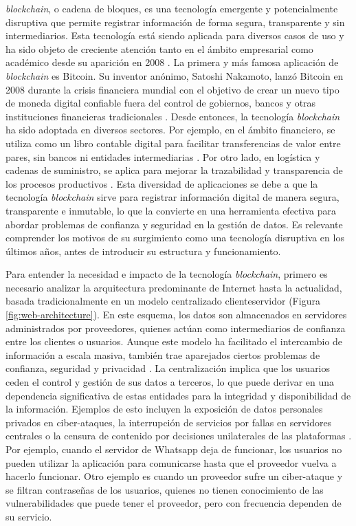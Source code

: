 \textit{\Gls{blockchain}}, o cadena de bloques, es una tecnología emergente y potencialmente disruptiva que permite registrar información de forma segura, transparente y sin intermediarios. Esta tecnología está siendo aplicada para diversos casos de uso y ha sido objeto de creciente atención tanto en el ámbito empresarial como académico desde su aparición en 2008 \cite{satoshi2008bitcoin}. La primera y más famosa aplicación de \textit{blockchain} es Bitcoin. Su inventor anónimo, Satoshi Nakamoto, lanzó Bitcoin en 2008 durante la crisis financiera mundial con el objetivo de crear un nuevo tipo de moneda digital confiable fuera del control de gobiernos, bancos y otras instituciones financieras tradicionales \cite{satoshi2008bitcoin}. Desde entonces, la tecnología \textit{blockchain} ha sido adoptada en diversos sectores. Por ejemplo, en el ámbito financiero, se utiliza como un libro contable digital para facilitar transferencias de valor entre pares, sin bancos ni entidades intermediarias \cite{bulkowska2023implementation}. Por otro lado, en logística y cadenas de suministro, se aplica para mejorar la trazabilidad y transparencia de los procesos productivos \cite{rejeb2023role}. Esta diversidad de aplicaciones se debe a que la tecnología \textit{blockchain} sirve para registrar información digital de manera segura, transparente e inmutable, lo que la convierte en una herramienta efectiva para abordar problemas de confianza y seguridad en la gestión de datos. Es relevante comprender los motivos de su surgimiento como una tecnología disruptiva en los últimos años, antes de introducir su estructura y funcionamiento.

Para entender la necesidad e impacto de la tecnología \textit{blockchain}, primero es necesario analizar la arquitectura predominante de Internet hasta la actualidad, basada tradicionalmente en un modelo centralizado \gls{clienteservidor} (Figura \ref{fig:web-architecture}). En este esquema, los datos son almacenados en servidores administrados por proveedores, quienes actúan como intermediarios de confianza entre los clientes o usuarios. Aunque este modelo ha facilitado el intercambio de información a escala masiva, también trae aparejados ciertos problemas de confianza, seguridad y privacidad \cite{gunawan2024review}. La centralización implica que los usuarios ceden el control y gestión de sus datos a terceros, lo que puede derivar en una dependencia significativa de estas entidades para la integridad y disponibilidad de la información. Ejemplos de esto incluyen la exposición de datos personales privados en ciber-ataques, la interrupción de servicios por fallas en servidores centrales o la censura de contenido por decisiones unilaterales de las plataformas \cite{gunawan2024review}. Por ejemplo, cuando el servidor de Whatsapp deja de funcionar, los usuarios no pueden utilizar la aplicación para comunicarse hasta que el proveedor vuelva a hacerlo funcionar. Otro ejemplo es cuando un proveedor sufre un ciber-ataque y se filtran contraseñas de los usuarios, quienes no tienen conocimiento de las vulnerabilidades que puede tener el proveedor, pero con frecuencia dependen de su servicio.

